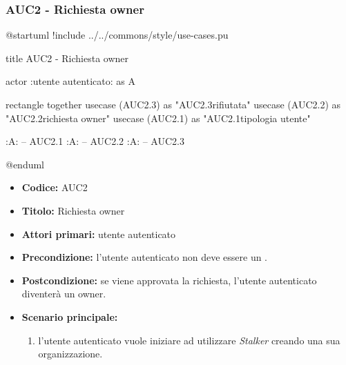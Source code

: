 \documentclass[casi-duso]{subfiles}
\begin{document}
\subsubsection{AUC2 - Richiesta owner}%
\label{subsub:AUC2}

\begin{plantuml}
@startuml
!include ../../commons/style/use-cases.pu

title AUC2 - Richiesta owner

actor :utente autenticato: as A

rectangle {
  together {
    usecase (AUC2.3) as "AUC2.3\nRichiesta rifiutata"
    usecase (AUC2.2) as "AUC2.2\nInvio richiesta owner"
    usecase (AUC2.1) as "AUC2.1\nVerifica tipologia utente"
  }
}

:A: -- AUC2.1
:A: -- AUC2.2
:A: -- AUC2.3

@enduml
\end{plantuml}

\begin{itemize}
  \item \textbf{Codice:} AUC2
  \item \textbf{Titolo:} Richiesta owner
  \item \textbf{Attori primari:} utente autenticato
  \item \textbf{Precondizione:} l'utente autenticato non deve essere un .
  \item \textbf{Postcondizione:} se viene approvata la richiesta, l'utente autenticato diventerà un owner.
  \item \textbf{Scenario principale:}
  \begin{enumerate}
    \item l'utente autenticato vuole iniziare ad utilizzare \emph{Stalker} creando una sua organizzazione.
  \end{enumerate}
\end{itemize}
\end{document}
